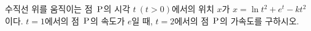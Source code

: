수직선 위를 움직이는 점~$\mathrm{P}$의 시각 $t\ (t>0)$에서의 위치 $x$가 $x=\ln t^2+e^t-kt^2$이다. $t=1$에서의 점~$\mathrm{P}$의 속도가 $e$일 때, $t=2$에서의 점~$\mathrm{P}$의 가속도를 구하시오. 
